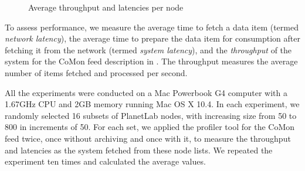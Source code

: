 \begin{figure}[t]
\begin{center}
\caption{Average throughput and latencies per node}
\label{fig:throughput}
\end{center}
\end{figure}

To assess performance, we measure 
the average time to fetch a data item (termed {\em network latency}), 
the average time to prepare the data item for consumption
after fetching it from the network (termed {\em system latency}),
and the {\em throughput} of the system for the CoMon feed
description in . 
The throughput measures the average
number of items fetched and processed per second. 

All the experiments were conducted on a Mac Powerbook G4 computer
with a 1.67GHz CPU and 2GB memory running Mac OS X 10.4.
In each experiment, we randomly selected 16 subsets of PlanetLab
nodes, with increasing size from 50 to 800 in increments of 50.
For each set, we applied the profiler tool for the CoMon feed
twice, once without archiving and once with it, to measure the
throughput and latencies as the system fetched from these node lists. 
We repeated the experiment ten times and calculated the average values.

